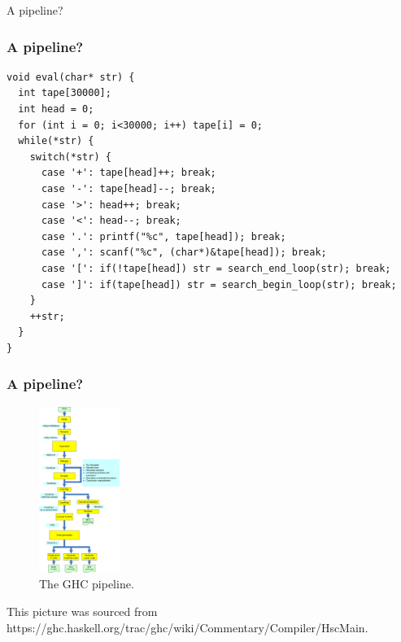 \documentclass[aspectratio=169]{beamer}
\begin{document}
  \begin{frame}{A pipeline?}
  \end{frame}
  \begin{frame}[fragile]
    \frametitle{A pipeline?}
    \begin{listing}[H]
      \caption{A silly Brainfuck VM}
      \begin{verbatim}
void eval(char* str) {
  int tape[30000];
  int head = 0;
  for (int i = 0; i<30000; i++) tape[i] = 0;
  while(*str) {
    switch(*str) {
      case '+': tape[head]++; break;
      case '-': tape[head]--; break;
      case '>': head++; break;
      case '<': head--; break;
      case '.': printf("%c", tape[head]); break;
      case ',': scanf("%c", (char*)&tape[head]); break;
      case '[': if(!tape[head]) str = search_end_loop(str); break;
      case ']': if(tape[head]) str = search_begin_loop(str); break;
    }
    ++str;
  }
}
      \end{verbatim}
    \end{listing}
  \end{frame}
  \begin{frame}[fragile]
    \frametitle{A pipeline?}
    \begin{figure}
      \includegraphics[height=5.4cm]{ghc_pipeline.png}
      \caption{The GHC pipeline.}
    \end{figure}
    \scriptsize This picture was sourced from https://ghc.haskell.org/trac/ghc/wiki/Commentary/Compiler/HscMain.
  \end{frame}
\end{document}
